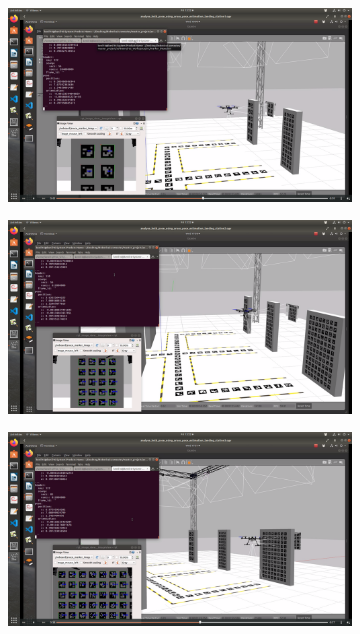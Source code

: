 \documentclass[../Head/report.tex]{subfiles}
\begin{document}
\begin{figure}[H]
    \centering
    \begin{subfigure}[t]{.30\textwidth}
        \centering
        \includegraphics[width=\textwidth]{../Figures/hold_pose_using_aruco_pose_estimation/aruco_board_three.png}
        \caption{}
        \label{fig:hold_pose_aruco_board_three}
    \end{subfigure}
     \hspace{0.2em}
    \begin{subfigure}[t]{.30\textwidth}
        \centering
        \includegraphics[width=\textwidth]{../Figures/hold_pose_using_aruco_pose_estimation/aruco_board_four.png}
        \caption{}
        \label{fig:hold_pose_aruco_board_four}
    \end{subfigure}
     \hspace{0.2em}
    \begin{subfigure}[t]{.30\textwidth}
        \centering
        \includegraphics[width=\textwidth]{../Figures/hold_pose_using_aruco_pose_estimation/aruco_board_five.png}

\end{subfigure}
\end{figure}
\end{document}
